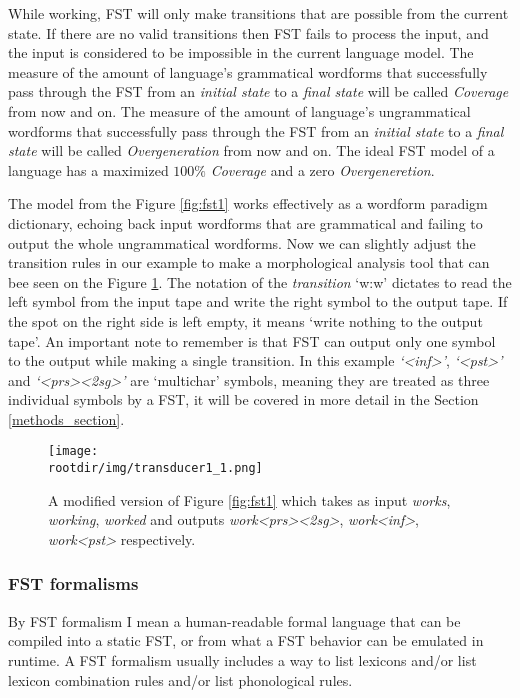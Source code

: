 While working, FST will only make transitions that are possible from the current state. If there are no valid transitions then FST fails to process the input, and the input is considered to be impossible in the current language model. The measure of the amount of language's grammatical wordforms that successfully pass through the FST from an \textit{initial state} to a \textit{final state} will be called \textit{Coverage} from now and on. The measure of the amount of language's ungrammatical wordforms that successfully pass through the FST from an \textit{initial state} to a \textit{final state} will be called \textit{Overgeneration} from now and on. The ideal FST model of a language has a maximized $100\%$ \textit{Coverage} and a zero \textit{Overgeneretion}.

The model from the Figure \ref{fig:fst1} works effectively as a wordform paradigm dictionary, echoing back input wordforms that are grammatical and failing to output the whole ungrammatical wordforms. Now we can slightly adjust the transition rules in our example to make a morphological analysis tool that can bee seen on the Figure \ref{fig:fst1_1}. The notation of the \textit{transition} `w:w' dictates to read the left symbol from the input tape and write the right symbol to the output tape. If the spot on the right side is left empty, it means `write nothing to the output tape'. An important note to remember is that FST can output only one symbol to the output while making a single transition. In this example \textit{`<inf>'}, \textit{`<pst>'} and \textit{`<prs><2sg>'} are `multichar' symbols, meaning they are treated as three individual symbols by a FST, it will be covered in more detail in the Section \ref{methods_section}.

\begin{figure}[!h]
    \centering
    \texttt{[image: \\rootdir/img/transducer1\_1.png]}
    \caption{A modified version of Figure \ref{fig:fst1} which takes as input \textit{works}, \textit{working}, \textit{worked} and outputs \textit{work<prs><2sg>}, \textit{work<inf>}, \textit{work<pst>} respectively.}
    \label{fig:fst1_1}
\end{figure}

\subsubsection{FST formalisms}
By FST formalism I mean a human-readable formal language that can be compiled into a static FST, or from what a FST behavior can be emulated in runtime. A FST formalism usually includes a way to list lexicons and/or list lexicon combination rules and/or list phonological rules.

